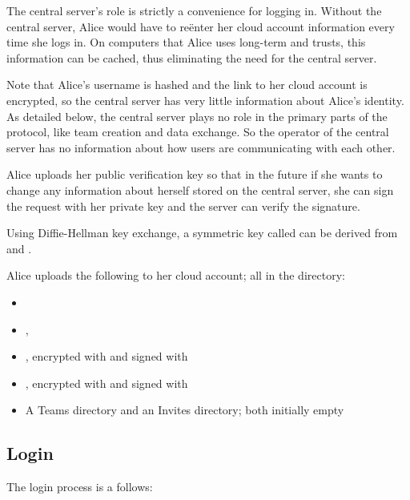 \documentclass[pldi-cameraready,10pt]{sigplanconf-pldi16}
\begin{document}
The central server's role is strictly a convenience for logging in.
Without the central server, Alice would have to re\"{e}nter her cloud account information every time she logs in.
On computers that Alice uses long-term and trusts, this information can be cached, thus eliminating the need for the central server.

Note that Alice's username is hashed and the link to her cloud account is encrypted, so the central server has very little information about Alice's identity.
As detailed below, the central server plays no role in the primary parts of the protocol, like team creation and data exchange.
So the operator of the central server has no information about how users are communicating with each other.

Alice uploads her public verification key so that in the future if she wants to change any information about herself stored on the central server, she can sign the request with her private key and the server can verify the signature.

Using Diffie-Hellman key exchange, a symmetric key called  can be derived from  and .

Alice uploads the following to her cloud account; all in the  directory:

\begin{itemize}
\item {}
\item {}, 
\item {}, encrypted with  and signed with 
\item {}, encrypted with  and signed with 
\item A Teams directory and an Invites directory; both initially empty
\end{itemize}

\subsection{Login}

The login process is a follows:
\end{document}
